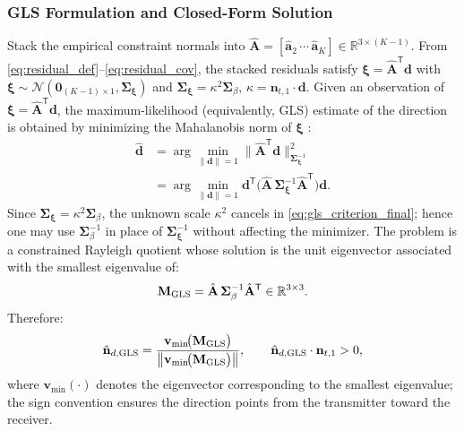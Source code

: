 \documentclass[journal]{IEEEtran}
\begin{document}
\subsubsection{GLS Formulation and Closed-Form Solution}
Stack the empirical constraint normals into
\(\hat{\mathbf A}=[\hat{\mathbf a}_2\,\cdots\,\hat{\mathbf a}_K]\in\mathbb R^{3\times(K-1)}.\)
From \eqref{eq:residual_def}–\eqref{eq:residual_cov}, the stacked residuals satisfy
\(\boldsymbol{\xi}=\hat{\mathbf A}^{\mathsf T}\mathbf d\)
with
\(\boldsymbol{\xi}\sim\mathcal N(\mathbf{0}_{(K-1)\times 1},\mathbf\Sigma_{\boldsymbol{\xi}})\)
and
\(\mathbf\Sigma_{\boldsymbol{\xi}}=\kappa^{2}\mathbf\Sigma_{\beta}\),
\(\kappa=\mathbf n_{t,1}\!\cdot\!\mathbf d\).
Given an observation of \(\boldsymbol{\xi}=\hat{\mathbf A}^{\mathsf T}\mathbf d\), the maximum-likelihood (equivalently, GLS) estimate of the direction is obtained by minimizing the Mahalanobis norm of \(\boldsymbol{\xi}\) \cite{Bishop2006}:
\begin{equation}
\begin{aligned}
  \hat{\mathbf d}
  &= \arg\min_{\|\mathbf d\|=1}
     \bigl\|\hat{\mathbf A}^{\mathsf T}\mathbf d\bigr\|^{2}_{\mathbf\Sigma_{\boldsymbol{\xi}}^{-1}} \\
  &= \arg\min_{\|\mathbf d\|=1}
     \mathbf d^{\mathsf T}\!\bigl(\hat{\mathbf A}\,\mathbf\Sigma_{\boldsymbol{\xi}}^{-1}\hat{\mathbf A}^{\mathsf T}\bigr)\mathbf{d}.     
\end{aligned}
\label{eq:gls_criterion_final}
\end{equation}
Since \(\mathbf\Sigma_{\boldsymbol{\xi}}=\kappa^{2}\mathbf\Sigma_{\beta}\), the unknown scale \(\kappa^{2}\) cancels in \eqref{eq:gls_criterion_final}; hence one may use \(\mathbf\Sigma_{\beta}^{-1}\) in place of \(\mathbf\Sigma_{\boldsymbol{\xi}}^{-1}\) without affecting the minimizer. The problem is a constrained Rayleigh quotient whose solution is the unit eigenvector associated with the smallest eigenvalue of:
\begin{equation}
  \mathbf M_{\rm GLS}=\hat{\mathbf A}\,\mathbf\Sigma_{\beta}^{-1}\hat{\mathbf A}^{\mathsf T}\in\mathbb R^{3\times3}.
  \label{eq:M_GLS_final}
\end{equation}
Therefore:
\begin{equation}
  \hat{\mathbf n}_{d,{\rm GLS}}
  = \frac{\mathbf v_{\min}\!\bigl(\mathbf M_{\rm GLS}\bigr)}
         {\bigl\|\mathbf v_{\min}\!\bigl(\mathbf M_{\rm GLS}\bigr)\bigr\|},
  \qquad
  \hat{\mathbf n}_{d,{\rm GLS}}\cdot\mathbf n_{t,1} > 0,
  \label{eq:gls_dir_final}
\end{equation}
where \(\mathbf v_{\min}(\cdot)\) denotes the eigenvector corresponding to the smallest eigenvalue; the sign convention ensures the direction points from the transmitter toward the receiver.
\end{document}
